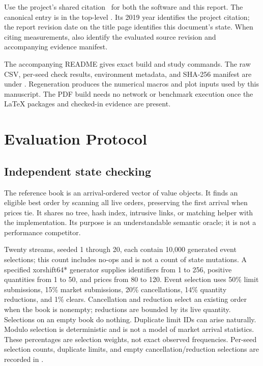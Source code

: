 \documentclass[10pt,letterpaper,twocolumn]{article}
\begin{document}
Use the project's shared citation~\cite{kauten-limit-order-book-2019} for both the software
and this report. The canonical entry is in the top-level .
Its 2019 year identifies the project citation; the report revision date on
the title page identifies this document's state. When citing measurements,
also identify the evaluated source revision and accompanying evidence manifest.

The accompanying README gives exact build and study commands. The raw CSV,
per-seed check results, environment metadata, and SHA-256 manifest are under
. Regeneration produces the numerical macros
and plot inputs used by this manuscript. The PDF build needs no network or
benchmark execution once the LaTeX packages and checked-in evidence are present.

\begingroup
\raggedright


\endgroup

\clearpage
\onecolumn
\appendix
\section{Evaluation Protocol}\label{sec:protocol}
\subsection{Independent state checking}
The reference book is an arrival-ordered vector of value objects. It finds
an eligible best order by scanning all live orders, preserving the first
arrival when prices tie. It shares no tree, hash index, intrusive links, or
matching helper with the implementation. Its purpose is an understandable
semantic oracle; it is not a performance competitor.

Twenty streams, seeded 1 through 20, each contain 10,000 generated event
selections; this count includes no-ops and is not a count of state mutations.
A specified xorshift64* generator supplies identifiers from 1 to 256, positive
quantities from 1 to 50, and prices from 80 to 120. Event selection uses 50\%
limit submissions, 15\% market submissions, 20\% cancellations, 14\% quantity
reductions, and 1\% clears. Cancellation and reduction select an existing
order when the book is nonempty; reductions are bounded by its live quantity.
Selections on an empty book do nothing. Duplicate limit IDs can arise
naturally. Modulo selection is deterministic and is not a model of market
arrival statistics. These percentages are selection weights, not exact
observed frequencies. Per-seed selection counts, duplicate limits, and empty
cancellation/reduction selections are recorded in .
\end{document}
